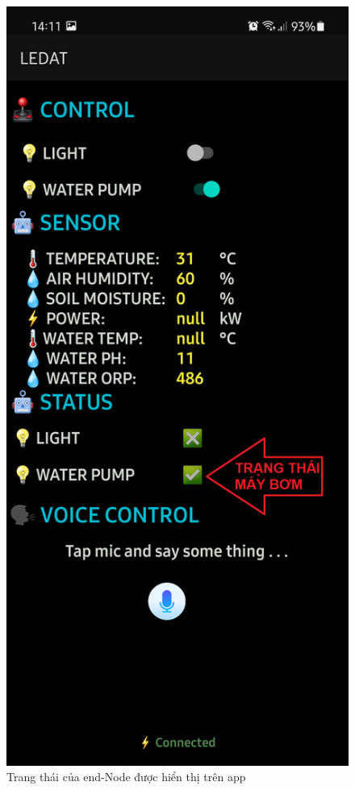 \begin{figure}[H]
	\centering
	\includegraphics[scale=0.2]{Chapter 4/image chapter 4/appR1OFFR2ON.png}
	\caption[Trang thái của end-Node được hiển thị trên app]{Trang thái của end-Node được hiển thị trên app}
	\label{hinh49}
\end{figure}
